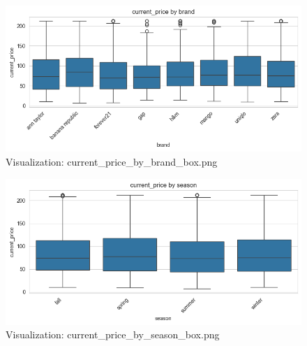 \documentclass{article}%
\begin{document}
\begin{minipage}[c]{0.48\textwidth}%


\begin{figure}[H]%
\centering%
\includegraphics[width=\linewidth]{output/plots/current_price_by_brand_box.png}%
\caption{Visualization: current\_price\_by\_brand\_box.png}%
\end{figure}

%
\end{minipage}%
\begin{minipage}[c]{0.48\textwidth}%


\begin{figure}[H]%
\centering%
\includegraphics[width=\linewidth]{output/plots/current_price_by_season_box.png}%
\caption{Visualization: current\_price\_by\_season\_box.png}%
\end{figure}

%
\end{minipage}%
\vspace{10pt}%
\\%
\end{document}
